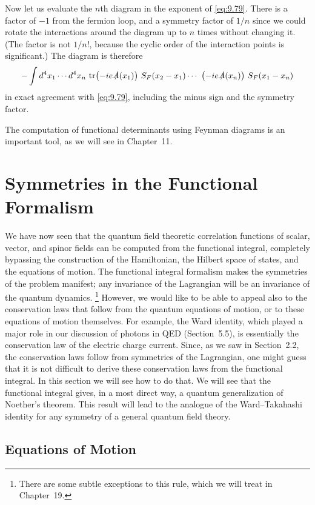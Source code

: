 Now let us evaluate the $n$th diagram in the exponent of \eqref{eq:9.79}.
There is a factor of $-1$ from the fermion loop, and a symmetry factor of $1/n$
since we could rotate the interactions around the diagram up to $n$ times
without changing it.  (The factor is not $1/n!$, because the cyclic order of
the interaction points is significant.)  The diagram is therefore
\begin{equation}
  -\int d^4x_1\cdots d^4x_n\ \mathrm{tr}\bigl( -ie\slashed{A}(x_1) \bigr)\
    S_F(x_2-x_1)\cdots\ \bigl( -ie\slashed{A}(x_n) \bigr)\ S_F(x_1-x_n)
  \label{eq:9.81}
\end{equation}
in exact agreement with \eqref{eq:9.79}, including the minus sign and the
symmetry factor.

The computation of functional determinants using Feynman diagrams is an
important tool, as we will see in Chapter~11.

\section{Symmetries in the Functional Formalism}

We have now seen that the quantum field theoretic correlation functions of
scalar, vector, and spinor fields can be computed from the functional integral,
completely bypassing the construction of the Hamiltonian, the Hilbert space of
states, and the equations of motion.  The functional integral formalism makes
the symmetries of the problem manifest; any invariance of the Lagrangian will
be an invariance of the quantum dynamics.%
\footnote{There are some subtle exceptions to this rule, which we will treat in
Chapter~19.}  However, we would like to be able to appeal also to the
conservation laws that follow from the quantum equations of motion, or to
these equations of motion themselves.  For example, the Ward identity, which
played a major role in our discussion of photons in QED (Section~5.5), is
essentially the conservation law of the electric charge current.  Since, as we
saw in Section~2.2, the conservation laws follow from symmetries of the
Lagrangian, one might guess that it is not difficult to derive these
conservation laws from the functional integral.  In this section we will see
how to do that.  We will see that the functional integral gives, in a most
direct way, a quantum generalization of Noether's theorem.  This result will
lead to the analogue of the Ward--Takahashi identity for any symmetry of a
general quantum field theory.

\subsection{Equations of Motion}

